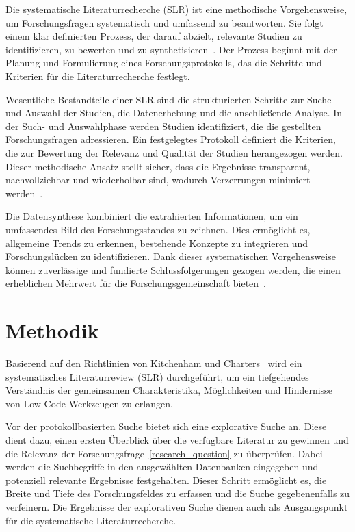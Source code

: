 Die systematische Literaturrecherche (SLR) ist eine methodische Vorgehensweise, um Forschungsfragen 
systematisch und umfassend zu beantworten. Sie folgt einem klar definierten Prozess, der darauf abzielt, 
relevante Studien zu identifizieren, zu bewerten und zu synthetisieren~\cite{kitchenham2007guidelines}. 
Der Prozess beginnt mit der Planung und Formulierung eines Forschungsprotokolls, das die Schritte und 
Kriterien für die Literaturrecherche festlegt.

Wesentliche Bestandteile einer SLR sind die strukturierten Schritte zur Suche und Auswahl der Studien, 
die Datenerhebung und die anschließende Analyse. In der Such- und Auswahlphase werden Studien identifiziert, 
die die gestellten Forschungsfragen adressieren. Ein festgelegtes Protokoll definiert die Kriterien, die 
zur Bewertung der Relevanz und Qualität der Studien herangezogen werden. Dieser methodische Ansatz stellt 
sicher, dass die Ergebnisse transparent, nachvollziehbar und wiederholbar sind, wodurch Verzerrungen 
minimiert werden~\cite{okoli2015guide}. 

Die Datensynthese kombiniert die extrahierten Informationen, um ein umfassendes Bild des Forschungsstandes 
zu zeichnen. Dies ermöglicht es, allgemeine Trends zu erkennen, bestehende Konzepte zu integrieren und 
Forschungslücken zu identifizieren. Dank dieser systematischen Vorgehensweise können zuverlässige und 
fundierte Schlussfolgerungen gezogen werden, die einen erheblichen Mehrwert für 
die Forschungsgemeinschaft bieten~\cite{petersen2008systematic}.

\section{Methodik}
Basierend auf den Richtlinien von Kitchenham und Charters~\cite{kitchenham2007guidelines} wird ein systematisches 
Literaturreview (SLR) durchgeführt, um ein tiefgehendes Verständnis der gemeinsamen Charakteristika, Möglichkeiten 
und Hindernisse von Low-Code-Werkzeugen zu erlangen.

Vor der protokollbasierten Suche bietet sich eine explorative Suche an. Diese dient dazu, einen ersten Überblick über die verfügbare Literatur zu gewinnen und 
die Relevanz der Forschungsfrage~\ref{research_question} zu überprüfen. Dabei werden die Suchbegriffe in den ausgewählten 
Datenbanken eingegeben und potenziell relevante Ergebnisse festgehalten. Dieser Schritt ermöglicht es, 
die Breite und Tiefe des Forschungsfeldes zu erfassen und die Suche gegebenenfalls zu verfeinern. 
Die Ergebnisse der explorativen Suche dienen auch als Ausgangspunkt für die systematische Literaturrecherche. 

